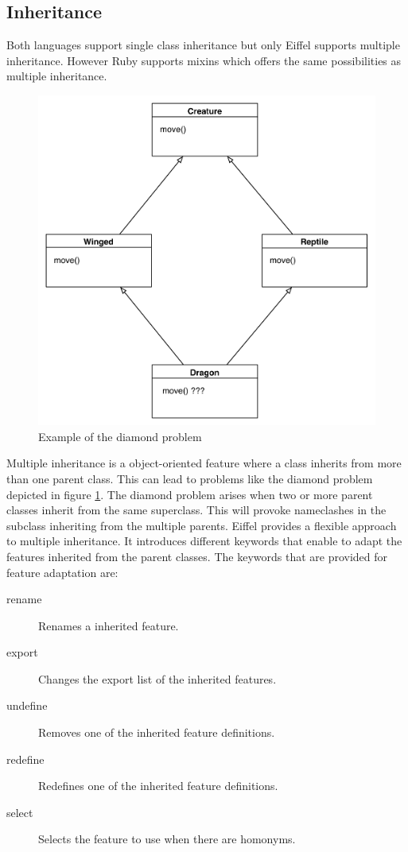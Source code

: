 \documentclass[11pt,a4paper,twocolumn]{article}
\begin{document}
\subsection{Inheritance}
Both languages support single class inheritance but only Eiffel supports multiple inheritance. However Ruby supports mixins which offers the same possibilities as multiple inheritance.
\\
% 
\begin{figure}[h!]
\centering
\includegraphics[scale=0.4]{diamond.pdf}
\caption{Example of the diamond problem}
\label{fig:diamond}
\end{figure}
Multiple inheritance is a object-oriented feature where a class inherits from more than one parent class. This can lead to problems like the diamond problem depicted in figure \ref{fig:diamond}. The diamond problem arises when two or more parent classes inherit from the same superclass. This will provoke nameclashes in the subclass inheriting from the multiple parents. Eiffel provides a flexible approach to multiple inheritance. It introduces different keywords that enable to adapt the features inherited from the parent classes. The keywords that are provided for feature adaptation are:
\begin{description}
\item[rename] Renames a inherited feature.
\item[export] Changes the export list of the inherited features.
\item[undefine] Removes one of the inherited feature definitions.
\item[redefine] Redefines one of the inherited feature definitions.
\item[select] Selects the feature to use when there are homonyms.
\end{description}
\end{document}
